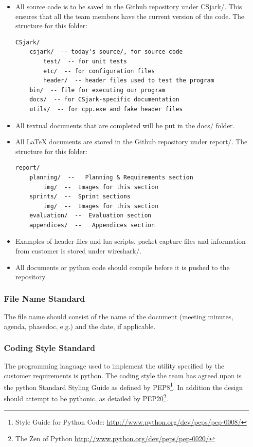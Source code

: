 \begin{itemize}
	\item All source code is to be saved in the Github \gls{repository} under
		CSjark/. This ensures that all the team members have the current
		version of the code. The structure for this folder:
		\begin{verbatim}
CSjark/
    csjark/  -- today's source/, for source code
        test/  -- for unit tests
        etc/  -- for configuration files
        header/  -- header files used to test the program
    bin/  -- file for executing our program
    docs/  -- for CSjark-specific documentation
    utils/  -- for cpp.exe and fake header files
		\end{verbatim}
	\item All textual documents that are completed will be put in the
		docs/ folder.
	\item All LaTeX documents are stored in the Github \gls{repository}
		under report/. The structure for this folder:
		\begin{verbatim}
report/
    planning/  --   Planning & Requirements section
        img/  --  Images for this section
    sprints/  --  Sprint sections
        img/  --  Images for this section
    evaluation/  --  Evaluation section
    appendices/  --   Appendices section
		\end{verbatim}
	\item Examples of \gls{header}-files and \Gls{lua}-\glspl{script}, \gls{packet} capture-files and information from customer is stored under \Gls{wireshark}/.
	\item All documents or python code should compile before it is pushed to the repository
\end{itemize}

\subsubsection{File Name Standard}
The file name should consist of the name of the document (meeting minutes,
agenda, phasedoc, e.g.) and the date, if applicable.

\subsubsection{Coding Style Standard}
The programming language used to implement the utility specified by the
customer requirements is \Gls{python}. The coding style the team has agreed upon is
the \Gls{python} Standard Styling Guide as defined by
PEP8\footnote{Style Guide for Python Code: \url{http://www.python.org/dev/peps/pep-0008/}}.
In addition the design should attempt to be pythonic, as detailed by
PEP20\footnote{The Zen of Python \url{http://www.python.org/dev/peps/pep-0020/}}.

